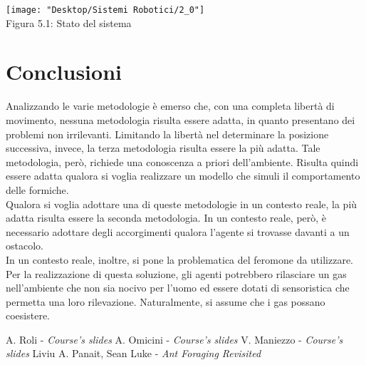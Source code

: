 \documentclass[12pt,a4paper,openright,twoside]{report}
\begin{document}
\begin{center}  
	\texttt{[image: "Desktop/Sistemi Robotici/2\_0"]}
	\\Figura 5.1: Stato del sistema
\end{center}


\clearpage{\pagestyle{empty}\cleardoublepage}
\chapter{Conclusioni}                %
\lhead[\fancyplain{}{\bfseries\thepage}]{\fancyplain{}{\bfseries\rightmark}}

Analizzando le varie metodologie è emerso che, con una completa libertà di movimento, nessuna metodologia risulta essere adatta, in quanto presentano dei problemi non irrilevanti. Limitando la libertà nel determinare la posizione successiva, invece, la terza metodologia risulta essere la più adatta. Tale metodologia, però, richiede una conoscenza a priori dell'ambiente. Risulta quindi essere adatta qualora si voglia realizzare un modello che simuli il comportamento delle formiche.\\
Qualora si voglia adottare una di queste metodologie in un contesto reale, la più adatta risulta essere la seconda metodologia. In un contesto reale, però, è necessario adottare degli accorgimenti qualora l'agente si trovasse davanti a un ostacolo.\\
In un contesto reale, inoltre, si pone la problematica del feromone da utilizzare. Per la realizzazione di questa soluzione, gli agenti potrebbero rilasciare un gas nell'ambiente che non sia nocivo per l'uomo ed essere dotati di sensoristica che permetta una loro rilevazione. Naturalmente, si assume che i gas possano coesistere.

	\clearpage{\pagestyle{empty}\cleardoublepage}
	\begin{thebibliography}{90}             %
		\rhead[\fancyplain{}{\bfseries \leftmark}]{\fancyplain{}{\bfseries
				\thepage}}
		 A. Roli - \textit{Course's slides}
		 A. Omicini - \textit{Course's slides}  
		 V. Maniezzo - \textit{Course's slides}  
		 Liviu A. Panait, Sean Luke - \textit{Ant Foraging Revisited}
	\end{thebibliography}
\end{document}
